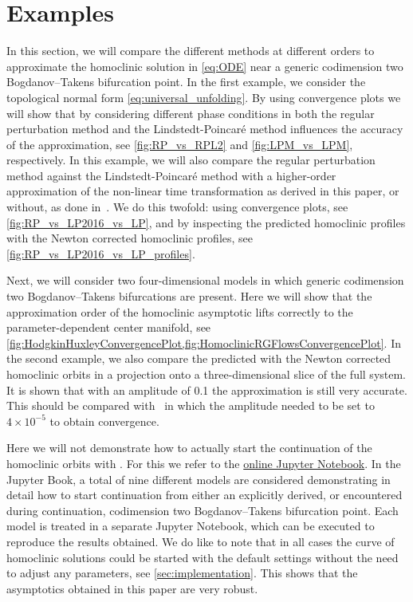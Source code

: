 \section{Examples}
\label{sec:examples}

In this section, we will compare the different methods at different orders to
approximate the homoclinic solution in \cref{eq:ODE} near a generic codimension two
Bogdanov--Takens bifurcation point. In the first example, we consider the
topological normal form \cref{eq:universal_unfolding}. By using convergence plots
we will show that by consi\-de\-ring different phase conditions in both the regular
perturbation method and the Lindstedt-Poincar\'e method influences the accuracy
of the approximation, see \cref{fig:RP_vs_RPL2} and \cref{fig:LPM_vs_LPM},
respectively. In this example, we will also compare the regular perturbation
method against the Lindstedt-Poincar\'e method with a higher-order
approximation of the non-linear time transformation as derived
in this paper, or without, as done in~\cite{Al-Hdaibat2016}. We do this twofold:
using convergence plots, see \cref{fig:RP_vs_LP2016_vs_LP}, and by inspecting
the predicted homoclinic profiles with the Newton corrected homoclinic
profiles, see \cref{fig:RP_vs_LP2016_vs_LP_profiles}.

Next, we will consider two four-dimensional models in which generic codimension
two Bogdanov--Takens bifurcations are present. Here we will show that the
approximation order of the homoclinic asymptotic lifts correctly to the
parameter-dependent center manifold, see
\cref{fig:HodgkinHuxleyConvergencePlot,fig:HomoclinicRGFlowsConvergencePlot}. In the
second example, we also compare the predicted with the Newton corrected
homoclinic orbits in a projection onto a three-dimensional slice of the full
system. It is shown that with an amplitude of 0.1 the approximation is still
very accurate. This should be compared with~\cite[section 6.2]{Al-Hdaibat2016}
in which the amplitude needed to be set to $4\times 10^{-5}$ to obtain
convergence.

Here we will not demonstrate how to actually start the continuation of the
homoclinic orbits with \MATCONT. For this we refer to the 
\href{https://mmbosschaert.github.io/MatCont7p2NewInitBTHom-/}{online Jupyter Notebook}.
In the Jupyter Book, a total of nine different models are considered
demonstrating in detail how to start continuation from either an explicitly
derived, or encountered during continuation, codimension two Bogdanov--Takens
bifurcation point. Each model is treated in a separate Jupyter Notebook, which
can be executed to reproduce the results obtained. We do like to note that in
all cases the curve of homoclinic solutions could be started with the default
settings without the need to adjust any parameters, see
\cref{sec:implementation}. This shows that the asymptotics obtained in this
paper are very robust.

